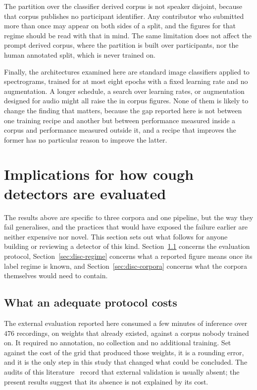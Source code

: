 \documentclass{ieeeaccess}
\begin{document}
The partition over the classifier derived corpus is not speaker disjoint, because that
corpus publishes no participant identifier. Any contributor who submitted more than once
may appear on both sides of a split, and the figures for that regime should be read with
that in mind. The same limitation does not affect the prompt derived corpus, where the
partition is built over participants, nor the human annotated split, which is never
trained on.

Finally, the architectures examined here are standard image classifiers applied to
spectrograms, trained for at most eight epochs with a fixed learning rate and no
augmentation. A longer schedule, a search over learning rates, or augmentation designed for
audio might all raise the in corpus figures. None of them is likely to change the finding
that matters, because the gap reported here is not between one training recipe and another
but between performance measured inside a corpus and performance measured outside it, and
a recipe that improves the former has no particular reason to improve the latter.

\section{Implications for how cough detectors are evaluated}\label{sec:discussion}

The results above are specific to three corpora and one pipeline, but the way they fail
generalises, and the practices that would have exposed the failure earlier are neither
expensive nor novel. This section sets out what follows for anyone building or reviewing
a detector of this kind. Section~\ref{sec:disc-protocol} concerns the evaluation protocol,
Section~\ref{sec:disc-regime} concerns what a reported figure means once its label regime
is known, and Section~\ref{sec:disc-corpora} concerns what the corpora themselves would
need to contain.

\subsection{What an adequate protocol costs}\label{sec:disc-protocol}

The external evaluation reported here consumed a few minutes of inference over $476$
recordings, on weights that already existed, against a corpus nobody trained on. It
required no annotation, no collection and no additional training. Set against the cost of
the grid that produced those weights, it is a rounding error, and it is the only step in
this study that changed what could be concluded. The audits of this
literature~\cite{roberts2021, han2022} record that external validation is usually absent;
the present results suggest that its absence is not explained by its cost.
\end{document}
